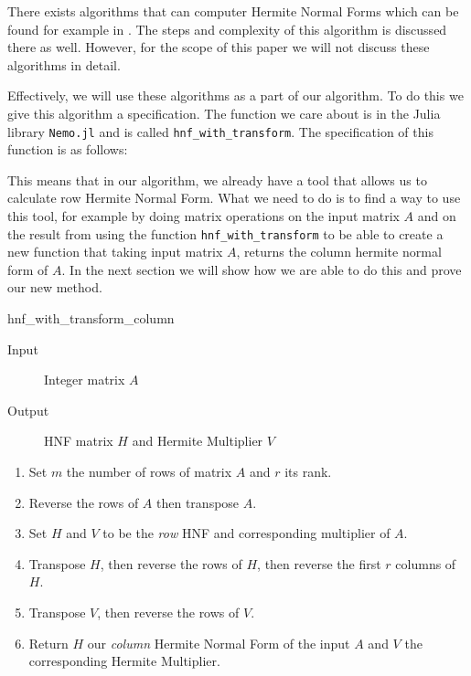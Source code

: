 \documentclass[oneside, a4paper, onecolumn, 11pt]{article}
\begin{document}
There exists algorithms that can computer Hermite Normal Forms which can be found for example in \cite{cohen2013course}. The steps and complexity of this algorithm is discussed there as well. However, for the scope of this paper we will not discuss these algorithms in detail.

Effectively, we will use these algorithms as a part of our algorithm. To do this we give this algorithm a specification. The function we care about is in the Julia library \texttt{Nemo.jl} \cite{nemo} and is called \texttt{hnf\_with\_transform}. The specification of this function is as follows:

This means that in our algorithm, we already have a tool that allows us to calculate row Hermite Normal Form. What we need to do is to find a way to use this tool, for example by doing matrix operations on the input matrix \(A\) and on the result from using the function \texttt{hnf\_with\_transform} to be able to create a new function that taking input matrix \(A\), returns the column hermite normal form of \(A\). In the next section we will show how we are able to do this and prove our new method.

\begin{algorithm}[H]
    \caption{hnf\_with\_transform\_column}

    \begin{description}
        \item[Input] Integer matrix \(A\)
        \item[Output] HNF matrix \(H\) and Hermite Multiplier \(V\)
    \end{description}

    \begin{enumerate}[label = \textbf{(Step~\arabic*)}, leftmargin=*, align=left, labelsep=2pt, itemsep=0pt]
        \item Set \(m\) the number of rows of matrix \(A\) and \(r\) its rank.
        \item Reverse the rows of \(A\) then transpose \(A\).
        \item Set \(H\) and \(V\) to be the \textit{row} HNF and corresponding multiplier of \(A\).
        \item Transpose \(H\), then reverse the rows of \(H\), then reverse the first \(r\) columns of \(H\).
        \item Transpose \(V\), then reverse the rows of \(V\).
        \item Return \(H\) our \textit{column} Hermite Normal Form of the input \(A\) and \(V\) the corresponding Hermite Multiplier.
    \end{enumerate}
\end{algorithm}
\end{document}
